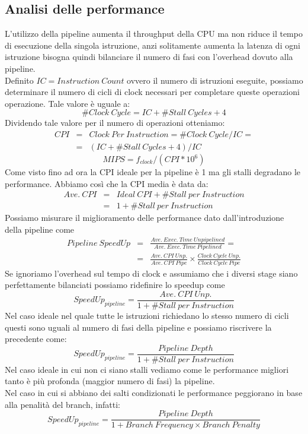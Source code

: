 \subsection{Analisi delle performance}
L'utilizzo della pipeline aumenta il throughput della CPU ma non riduce il tempo di esecuzione della singola istruzione, anzi solitamente aumenta la latenza di ogni istruzione bisogna quindi bilanciare il numero di fasi con l'overhead dovuto alla pipeline.\\
Definito $IC = Instruction \ Count$ ovvero il numero di istruzioni eseguite, possiamo determinare il numero di cicli di clock necessari per completare queste operazioni operazione. Tale valore è uguale a:
$$\#Clock \ Cycle = IC + \# Stall \ Cycles + 4$$
Dividendo tale valore per il numero di operazioni otteniamo:
$$
\begin{array}{rcl}
CPI & = &Clock \ Per \ Instruction = \# Clock \ Cycle /IC = \\
& = & (IC + \#Stall \ Cycles + 4)/IC
\end{array}
$$
$$MIPS= f_{clock} / (CPI * 10^6)$$
Come visto fino ad ora la CPI ideale per la pipeline è 1 ma gli stalli degradano le performance.
Abbiamo così che la CPI media è data da:
$$
\begin{array}{rcl}
Ave. \ CPI & = & Ideal \ CPI + \#Stall \ per \ Instruction \\
& = & 1 + \#Stall \ per \ Instruction
\end{array}
$$
Possiamo misurare il miglioramento delle performance dato dall'introduzione della pipeline come
$$
\begin{array}{rcl}
Pipeline \ SpeedUp & = & \frac{Ave. \ Exec. \ Time \ Unpipelined}{Ave. \ Exec. \ Time \ Pipelined} = \\
& = & \frac{Ave. \ CPI \ Unp.}{Ave. \ CPI \ Pipe} \times \frac{Clock \ Cycle \ Unp.}{Clock \ Cycle \ Pipe}
\end{array}
$$
Se ignoriamo l'overhead sul tempo di clock e assumiamo che i diversi stage siano perfettamente bilanciati possiamo ridefinire lo speedup come
$$SpeedUp_{pipeline} = \frac{Ave. \ CPI \ Unp.}{1 + \# Stall \ per \ Instruction}$$
Nel caso ideale nel quale tutte le istruzioni richiedano lo stesso numero di cicli questi sono uguali al numero di fasi della pipeline e possiamo riscrivere la precedente come:
$$SpeedUp_{pipeline} = \frac{Pipeline \ Depth}{1 + \# Stall \ per \ Instruction}$$
Nel caso ideale in cui non ci siano stalli vediamo come le performance migliori tanto è più profonda (maggior numero di fasi) la pipeline.\\
Nel caso in cui si abbiano dei salti condizionati le performance peggiorano in base alla penalità del branch, infatti:
$$SpeedUp_{pipeline} = \frac{Pipeline \ Depth}{1 + Branch \ Frequency \times Branch \ Penalty}$$

